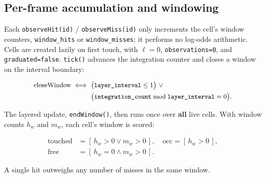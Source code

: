 \documentclass[conference]{IEEEtran}
\begin{document}
\subsection{Per-frame accumulation and windowing}
\label{sec:windowing}

Each \texttt{observeHit(id)} / \texttt{observeMiss(id)} only increments the cell's window
counters, \texttt{window\_hits} or \texttt{window\_misses}; it performs no log-odds
arithmetic. Cells are created lazily on first touch, with $\ell=0$,
\texttt{observations=0}, and \texttt{graduated=false}. \texttt{tick()} advances the integration
counter and closes a window on the interval boundary:

\begin{equation}
\small
\begin{split}
\text{closeWindow} \iff\ & \big(\texttt{layer\_interval}\le 1\big)\ \lor\ \\
& \big(\texttt{integration\_count} \bmod \texttt{layer\_interval} = 0\big).
\end{split}
\end{equation}

The layered update, \texttt{endWindow()}, then runs once over \textbf{all} live cells. With
window counts $h_w$ and $m_w$, each cell's window is scored:

\begin{equation}
\begin{split}
\text{touched}&=[\,h_w>0 \lor m_w>0\,],\quad
\text{occ}=[\,h_w>0\,],\\
\text{free}&=[\,h_w=0 \land m_w>0\,].
\end{split}
\end{equation}

A single hit outweighs any number of misses in the same window.
\end{document}

